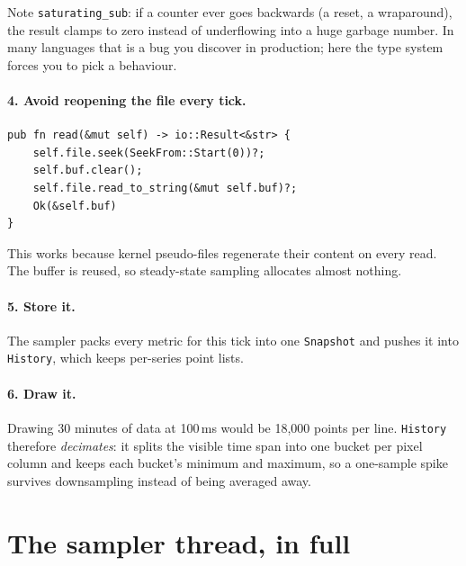 \documentclass[11pt,a4paper]{article}
\newcommand{\code}[1]{\texttt{#1}}
\newcommand{\file}[1]{\texttt{#1}}
\begin{document}
Note \code{saturating\_sub}: if a counter ever goes backwards (a reset, a wraparound), the
result clamps to zero instead of underflowing into a huge garbage number. In many languages
that is a bug you discover in production; here the type system forces you to pick a behaviour.

\paragraph{4. Avoid reopening the file every tick.}
\begin{lstlisting}[caption={\file{sampler/procfile.rs}: keep the file open and rewind.}]
pub fn read(&mut self) -> io::Result<&str> {
    self.file.seek(SeekFrom::Start(0))?;
    self.buf.clear();
    self.file.read_to_string(&mut self.buf)?;
    Ok(&self.buf)
}
\end{lstlisting}
This works because kernel pseudo-files regenerate their content on every read. The buffer is
reused, so steady-state sampling allocates almost nothing.

\paragraph{5. Store it.} The sampler packs every metric for this tick into one \code{Snapshot}
and pushes it into \code{History}, which keeps per-series point lists.

\paragraph{6. Draw it.} Drawing 30 minutes of data at 100\,ms would be 18,000 points per line.
\code{History} therefore \emph{decimates}: it splits the visible time span into one bucket per
pixel column and keeps each bucket's minimum and maximum, so a one-sample spike survives
downsampling instead of being averaged away.

\section{The sampler thread, in full}
\end{document}
